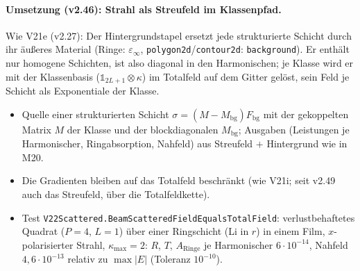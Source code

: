 \paragraph{Umsetzung (v2.46): Strahl als Streufeld im Klassenpfad.}
Wie V21e (v2.27): Der Hintergrundstapel ersetzt jede strukturierte Schicht durch ihr äußeres Material (Ringe:
$\varepsilon_\infty$, \verb|polygon2d|/\verb|contour2d|: \verb|background|). Er enthält nur homogene Schichten, ist also
diagonal in den Harmonischen; je Klasse wird er mit der Klassenbasis ($\mathbb 1_{2L+1}\otimes\kappa$) im Totalfeld auf
dem Gitter gelöst, sein Feld je Schicht als Exponentiale der Klasse.
\begin{itemize}[nosep]
  \item Quelle einer strukturierten Schicht $\sigma=(M-M_{\text{bg}})F_{\text{bg}}$ mit der gekoppelten Matrix $M$ der Klasse
        und der blockdiagonalen $M_{\text{bg}}$; Ausgaben (Leistungen je Harmonischer, Ringabsorption, Nahfeld) aus
        Streufeld $+$ Hintergrund wie in M20.
  \item Die Gradienten bleiben auf das Totalfeld beschränkt (wie V21i; seit v2.49 auch das Streufeld, über die
        Totalfeldkette).
  \item Test \verb|V22Scattered.BeamScatteredFieldEqualsTotalField|: verlustbehaftetes Quadrat ($P=4$, $L=1$) über einer
        Ringschicht (Li in $r$) in einem Film, $x$-polarisierter Strahl, $\kappa_{\max}=2$: $R$, $T$, $A_{\text{Ringe}}$ je
        Harmonischer $6\cdot10^{-14}$, Nahfeld $4{,}6\cdot10^{-13}$ relativ zu $\max|E|$ (Toleranz $10^{-10}$).
\end{itemize}

